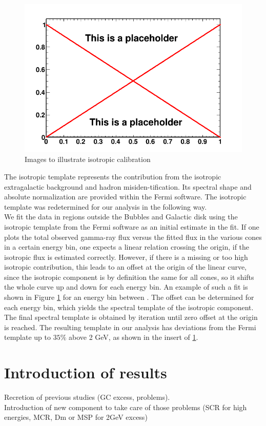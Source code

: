 \begin{figure}
 \centering
 \includegraphics[width=.9\linewidth]{pic/dummy.png}
 \caption{Images to illustrate isotropic calibration}
 \label{fig:iso_calibration}
\end{figure}

The isotropic template represents the contribution from the isotropic extragalactic background and hadron misiden-tification.  Its spectral shape and absolute normalization are provided within the Fermi software.  The isotropic template was redetermined for our analysis in the following way.\\
We fit the data in regions outside the Bubbles and Galactic disk using the isotropic template from the Fermi software as an initial estimate in the fit. If one plots the total observed gamma-ray flux versus the fitted flux in the various cones in a certain energy bin, one expects a linear relation crossing the origin, if the isotropic flux is estimated correctly. However, if there is a missing or too high isotropic contribution, this leads to an offset at the origin of the linear curve, since the isotropic component is by definition the same for all cones, so it shifts the whole curve up and down for each energy bin. An example of such a fit is shown in Figure \ref{fig:iso_calibration} for an energy bin between . The offset can be determined for each energy bin, which yields the spectral template of the isotropic component. The final spectral template is obtained by iteration until zero offset at the origin is reached. The resulting template in our analysis has deviations from the Fermi template up to $35\%$ above 2 GeV, as shown in the insert of \ref{fig:iso_calibration}.


\section{Introduction of results}

Recretion of previous studies (GC excess, problems).\\
Introduction of new component to take care of those problems (SCR for high energies, MCR, Dm or MSP for 2GeV excess)


